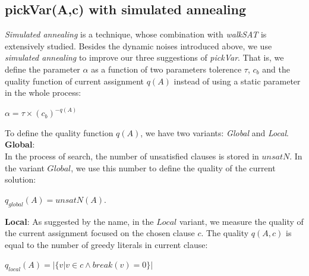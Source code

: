 \documentclass[12pt,a4paper,twoside]{scrartcl}
\numberwithin{equation}{section}
\begin{document}
\subsection{pickVar(A,c) with simulated annealing}
\emph{Simulated annealing} is a technique, whose combination with \emph{walkSAT} is extensively studied. Besides the dynamic noises introduced above, we use \emph{simulated annealing} to improve our three suggestions of \emph{pickVar}. That is, we define the parameter $\alpha$ as a function of two parameters tolerence $\tau$, $c_b$ and the quality function of current assignment $q(A)$ instead of using a static parameter in the whole process:
\begin{center}
 $\alpha = \tau \times (c_b)^{-q(A)}$\\
 \end{center}
To define the quality function $q(A)$, we have two variants: \emph{Global} and \emph{Local}.\\
\textbf{Global}:\\
In the process of search, the number of unsatisfied clauses is stored in $unsatN$. In the variant $Global$, we use this number to define the quality of the current solution:
\begin{center}
 $q_{global}(A) =unsatN(A)$.\\
\end{center}
\textbf{Local}:
As suggested by the name, in the $Local$ variant, we measure the quality of the current assignment focused on the chosen clause $c$. The quality  $q(A,c)$ is equal to the number of greedy literals in current clause:
\begin{center}
 $q_{local}(A) =|\{ v| v \in  c \land break(v) = 0\}|$\\
 \end{center}
\end{document}
